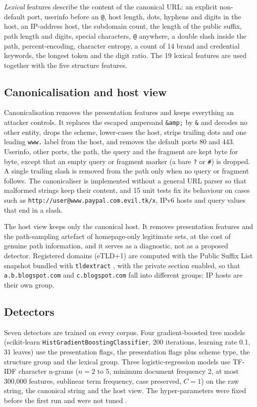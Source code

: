 \emph{Lexical} features describe the content of the canonical URL: an explicit non-default port, userinfo before an \texttt{@}, host length, dots, hyphens and digits in the host, an IP-address host, the subdomain count, the length of the public suffix, path length and digits, special characters, \texttt{@} anywhere, a double slash inside the path, percent-encoding, character entropy, a count of 14 brand and credential keywords, the longest token and the digit ratio. The 19 lexical features are used together with the five structure features.

\subsection{Canonicalisation and host view}
Canonicalisation removes the presentation features and keeps everything an attacker controls. It replaces the escaped ampersand \texttt{\&amp;} by \texttt{\&} and decodes no other entity, drops the scheme, lower-cases the host, strips trailing dots and one leading \texttt{www.} label from the host, and removes the default ports 80 and 443. Userinfo, other ports, the path, the query and the fragment are kept byte for byte, except that an empty query or fragment marker (a bare \texttt{?} or \texttt{\#}) is dropped. A single trailing slash is removed from the path only when no query or fragment follows. The canonicaliser is implemented without a general URL parser so that malformed strings keep their content, and 15 unit tests fix its behaviour on cases such as \texttt{http://user@www.paypal.com.evil.tk/x}, IPv6 hosts and query values that end in a slash.

The host view keeps only the canonical host. It removes presentation features and the path-sampling artefact of homepage-only legitimate sets, at the cost of genuine path information, and it serves as a diagnostic, not as a proposed detector. Registered domains (eTLD+1) are computed with the Public Suffix List snapshot bundled with \texttt{tldextract} \VerTldextract{}, with the private section enabled, so that \texttt{a.b.blogspot.com} and \texttt{c.blogspot.com} fall into different groups; IP hosts are their own group.

\subsection{Detectors}
Seven detectors are trained on every corpus. Four gradient-boosted tree models (scikit-learn \texttt{HistGradientBoostingClassifier}, 200 iterations, learning rate 0.1, 31 leaves) use the presentation flags, the presentation flags plus scheme type, the structure group and the lexical group. Three logistic-regression models use TF-IDF character n-grams ($n=2$ to $5$, minimum document frequency 2, at most 300,000 features, sublinear term frequency, case preserved, $C=1$) on the raw string, the canonical string and the host view. The hyper-parameters were fixed before the first run and were not tuned \citep{pedregosa2011}.

